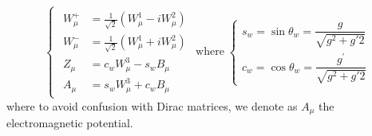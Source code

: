 \begin{equation}
\begin{cases}
	\begin{aligned}
		W_{\mu}^{+} &=\frac{1}{\sqrt{2}}\left(W_{\mu}^{1}-i W_{\mu}^{2}\right) \\
		W_{\mu}^{-} &=\frac{1}{\sqrt{2}}\left(W_{\mu}^{1}+i W_{\mu}^{2}\right) \\
		Z_{\mu} &=c_{w} W_{\mu}^{3}-s_{w} B_{\mu} \\
		A_{\mu} &=s_{w} W_{\mu}^{3}+c_{w} B_{\mu}
	\end{aligned}
\end{cases}
\text{where}
\;
\begin{cases}
	s_{w}=\sin \theta_{w}=\dfrac{g}{\sqrt{g^{2}+g{\prime2}}}\\
	c_{w}=\cos \theta_{w}=\dfrac{g^\prime}{\sqrt{g^{2}+g{\prime2}}}
\end{cases}
\end{equation}
where to avoid confusion with Dirac matrices, we denote as $A_\mu$ the electromagnetic potential.

